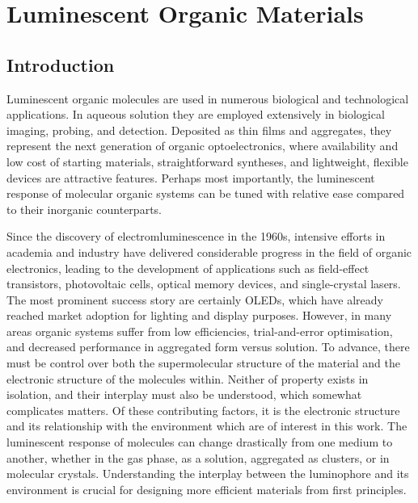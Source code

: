 \chapter{Luminescent Organic Materials}
\label{chapter: luminscent organic materials}
\section{Introduction}\label{section: lom introduction}
Luminescent organic molecules are used in numerous biological and technological applications. In aqueous solution they are employed extensively in biological imaging, probing, and detection. Deposited as thin films and aggregates, they represent the next generation of organic optoelectronics, where availability and low cost of starting materials, straightforward syntheses, and lightweight, flexible devices are attractive features. Perhaps most importantly, the luminescent response of molecular organic systems can be tuned with relative ease compared to their inorganic counterparts.

Since the discovery of electromluminescence in the 1960s, intensive efforts in academia and industry have delivered considerable progress in the field of organic electronics, leading to  the development of applications such as field-effect transistors, photovoltaic cells, optical memory devices, and single-crystal lasers.\cite{Ostroverkhova2016} The most prominent success story are certainly \acp{OLED}, which have already reached market adoption for lighting and display purposes. However, in many areas organic systems suffer from low efficiencies, trial-and-error optimisation, and decreased performance in aggregated form versus solution. 
To advance, there must be control over both the supermolecular structure of the material and the electronic structure of the  molecules within. Neither of property exists in isolation, and their interplay must also be understood, which somewhat complicates matters. Of these contributing factors, it is the electronic structure and its relationship with the environment which are of interest in this work. The luminescent response of molecules can change drastically from one medium to another, whether in the gas phase, as a solution, aggregated as clusters, or in molecular crystals. Understanding the interplay between the luminophore and its environment is crucial for designing more efficient materials from first principles. 

